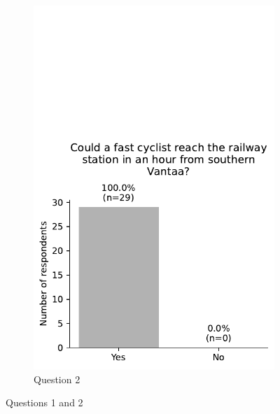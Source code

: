 \begin{figure}[H]
	\hfill
	\begin{subfigure}[b]{0.5\textwidth}
		\centering
		\includegraphics[width=\textwidth]{images/questionnaire/1.pdf}
		\caption{Question 2}
		\label{fig:Question 2}
	\end{subfigure}%
	\caption{Questions 1 and 2}
	\label{fig:Questions 1 and 2}
\end{figure}

